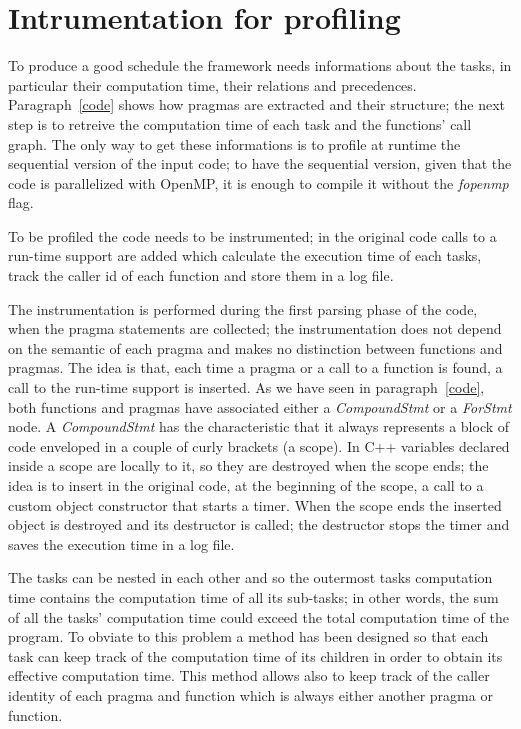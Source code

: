 \documentclass[a4paper,11pt,oneside]{book}
\begin{document}
\section{Intrumentation for profiling}

To produce a good schedule the framework needs informations about the tasks, in particular their computation time, their relations and precedences. Paragraph~\ref{code} shows how pragmas are extracted and their structure; the next step is to retreive the computation time of each task and the functions’ call graph. The only way to get these informations is to profile at run\-time the sequential version of the input code; to have the sequential version, given that the code is parallelized with OpenMP, it is enough to compile it without the \emph{\-fopenmp} flag. 

To be profiled the code needs to be instrumented; in the original code calls to a run-time support are added which calculate the execution time of each tasks, track the caller id of each function and store them in a log file. 

The instrumentation is performed during the first parsing phase of the code, when the pragma statements are collected; the instrumentation does not depend on the semantic of each pragma and makes no distinction between functions and pragmas. The idea is that, each time a pragma or a call to a function is found, a call to the run-time support is inserted. As we have seen in paragraph~\ref{code}, both functions and pragmas have associated either a \emph{CompoundStmt} or a \emph{ForStmt} node. A \emph{CompoundStmt} has the characteristic that it always represents a block of code enveloped in a couple of curly brackets (a scope). In C++ variables declared inside a scope are locally to it, so they are destroyed when the scope ends; the idea is to insert in the original code, at the beginning of the scope, a call to a custom object constructor that starts a timer. When the scope ends the inserted object is destroyed and its destructor is called; the destructor stops the timer and saves the execution time in a log file. 

The tasks can be nested in each other and so the outermost tasks computation time contains the computation time of all its sub-tasks; in other words, the sum of all the tasks’ computation time could exceed the total computation time of the program. To obviate to this problem a method has been designed so that each task can keep track of the computation time of its children in order to obtain its effective computation time. This method allows also to keep track of the caller identity of each pragma and function which is always either another pragma or function.
\end{document}
